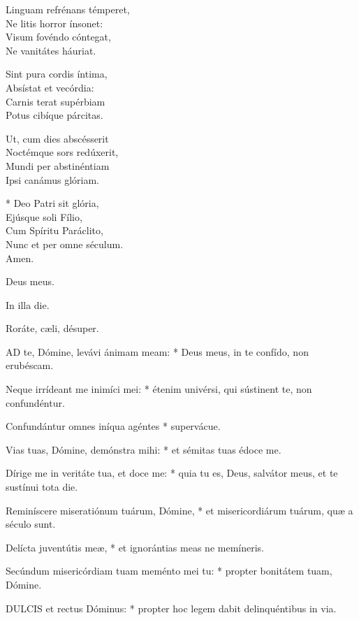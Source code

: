Linguam refrénans témperet,\\
Ne litis horror ínsonet:\\
Visum fovéndo cóntegat,\\
Ne vanitátes háuriat.

Sint pura cordis íntima,\\
Absístat et vecórdia:\\
Carnis terat supérbiam\\
Potus cibíque párcitas.

Ut, cum dies abscésserit\\
Noctémque sors redúxerit,\\
Mundi per abstinéntiam\\
Ipsi canámus glóriam.

* Deo Patri sit glória,\\
Ejúsque soli Fílio,\\
Cum Spíritu Paráclito,\\
Nunc et per omne séculum.\\
Amen.

  Deus meus.


  In illa die.

  Roráte, cæli, désuper.


\lettrine[lines=2]{A}{D} te, Dómine, levávi ánimam meam: * Deus meus, in te confído, non erubéscam.

Neque irrídeant me inimíci mei: * étenim univérsi, qui sústinent te, non confundéntur.

Confundántur omnes iníqua agéntes * supervácue.

Vias tuas, Dómine, demónstra mihi: * et sémitas tuas édoce me.

Dírige me in veritáte tua, et doce me: * quia tu es, Deus, salvátor meus, et te sustínui tota die.

Reminíscere miseratiónum tuárum, Dómine, * et misericordiárum tuárum, quæ a século sunt.

Delícta juventútis meæ, * et ignorántias meas ne memíneris.

Secúndum misericórdiam tuam meménto mei tu: * propter bonitátem tuam, Dómine.


\lettrine[lines=2]{D}{ULCIS} et rectus Dóminus: * propter hoc legem dabit delinquéntibus in via.

